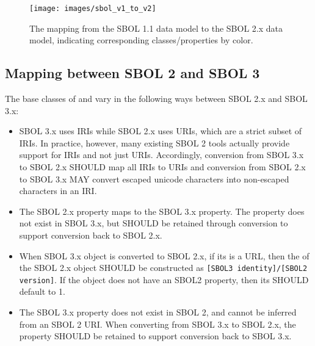 \begin{figure}[htp]
\begin{center}
  \texttt{[image: images/sbol\_v1\_to\_v2]}
\end{center}
\caption{\label{SBOL1TO2}The mapping from the SBOL 1.1 data model to the SBOL 2.x  data model, indicating corresponding classes/properties by color.}
\end{figure}



\subsection{Mapping between SBOL 2 and SBOL 3}

The base classes of  and  vary in the following ways between SBOL 2.x and SBOL 3.x:
\begin{itemize}
\item SBOL 3.x uses IRIs while SBOL 2.x uses URIs, which are a strict subset of IRIs. 
In practice, however, many existing SBOL 2 tools actually provide support for IRIs and not just URIs.
Accordingly, conversion from SBOL 3.x to SBOL 2.x SHOULD map all IRIs to URIs and conversion from SBOL 2.x to SBOL 3.x MAY convert escaped unicode characters into non-escaped characters in an IRI.
\item The SBOL 2.x  property  maps to the SBOL 3.x  property. The  property does not exist in SBOL 3.x, but SHOULD be retained through conversion to support conversion back to SBOL 2.x. 
\item When SBOL 3.x  object is converted to SBOL 2.x, if its  is a URL, then the  of the SBOL 2.x object SHOULD be constructed as \texttt{[SBOL3 identity]/[SBOL2 version]}. If the object does not have an SBOL2  property, then its  SHOULD default to 1.
\item The SBOL 3.x  property  does not exist in SBOL 2, and cannot be inferred from an SBOL 2 URI. When converting from SBOL 3.x to SBOL 2.x, the  property SHOULD be retained to support conversion back to SBOL 3.x.
\end{itemize}

